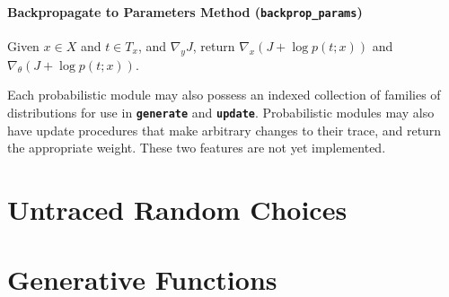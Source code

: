 \documentclass{article}
\newcommand{\code}[1]{\texttt{\small{\textbf{#1}}}}
\begin{document}
\paragraph{Backpropagate to Parameters Method (\code{backprop\_params})}
Given $x \in X$ and $t \in T_x$, and $\nabla_y J$, return $\nabla_x (J + \log p(t; x))$ and $\nabla_{\theta} (J + \log p(t; x))$.


Each probabilistic module may also possess an indexed collection of families of distributions for use in \code{generate} and \code{update}.
Probabilistic modules may also have update procedures that make arbitrary changes to their trace, and return the appropriate weight.
These two features are not yet implemented.

\section{Untraced Random Choices}

\section{Generative Functions}

\clearpage


\end{document}
